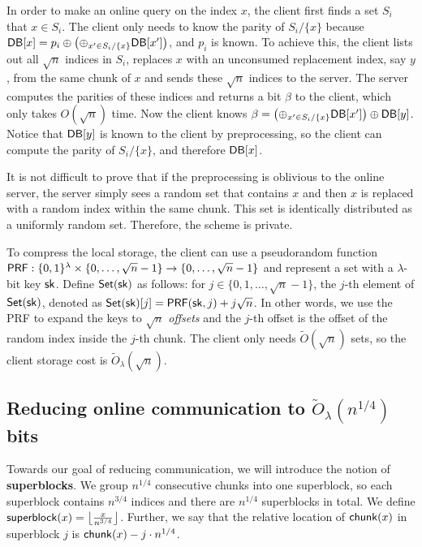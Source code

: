In order to make an online query on the index $x$, the client first finds a set
$S_i$ that $x\in S_i$. The client only needs to know the parity of $S_i/\{x\}$
because $\mathsf{DB}[x]=p_i \oplus\left(\oplus_{x'\in S_i/\{x\}}\mathsf{DB}[x']\right)$, and $p_i$
is known. To achieve this, the client lists out all $\sqrt{n}$ indices in $S_i$,
replaces $x$ with an unconsumed replacement index, say $y$, from the same chunk
of $x$ and sends these $\sqrt{n}$ indices to the server. The server computes the
parities of these indices and returns a bit $\beta$ to the client, which only
takes $O(\sqrt{n})$ time. Now the client knows $\beta=\left(\oplus_{x'\in
S_i/\{x\}}\mathsf{DB}[x']\right)\oplus \mathsf{DB}[y]$. Notice that $\mathsf{DB}[y]$ is known to the
client by preprocessing, so the client can compute the parity of $S_i/\{x\}$,
and therefore $\mathsf{DB}[x]$.

It is not difficult to prove that if the preprocessing is oblivious to the online server, the
server simply sees a random set that contains $x$ and then $x$ is replaced with
a random index within the same chunk. This set is identically distributed as a
uniformly random set. %
Therefore, the scheme is private.

To compress the local storage, the client can use a pseudorandom function
$\mathsf{PRF}:\{0,1\}^\lambda \times \{0,\dots,\sqrt{n}-1\} \to \{0,\dots,\sqrt{n}-1\}$
and represent a set with a $\lambda$-bit key $\mathsf{sk}$. Define $\mathsf{Set}(\mathsf{sk})$ as
follows: for $j\in \{0,1,\ldots,\sqrt{n}-1\}$, the $j$-th element of
$\mathsf{Set}(\mathsf{sk})$, denoted as $\mathsf{Set}(\mathsf{sk})[j]=\mathsf{PRF}(\mathsf{sk}, j) + j\sqrt{n}$. In other words,
we use the PRF to expand the keys to $\sqrt{n}$ \emph{offsets} and the $j$-th
offset is the offset of the random index inside the $j$-th chunk. The client
only needs $\widetilde{O}(\sqrt{n})$ sets, so the client storage cost is
$\widetilde{O}_\lambda(\sqrt{n})$. 

\subsection{Reducing online communication to $\widetilde{O}_\lambda(n^{1/4})$
bits}
Towards our goal of reducing communication, we will introduce the notion of {\bf
superblocks}. We group $n^{1/4}$ consecutive chunks into one superblock, so each
superblock contains $n^{3/4}$ indices and there are $n^{1/4}$ superblocks in
total. We define $\mathsf{superblock}(x)=\left\lfloor \frac{x}{n^{3/4}}\right\rfloor$.
Further, we say that the relative location of $\mathsf{chunk}(x)$ in superblock $j$ is
$\mathsf{chunk}(x)-j\cdot n^{1/4}$. 

